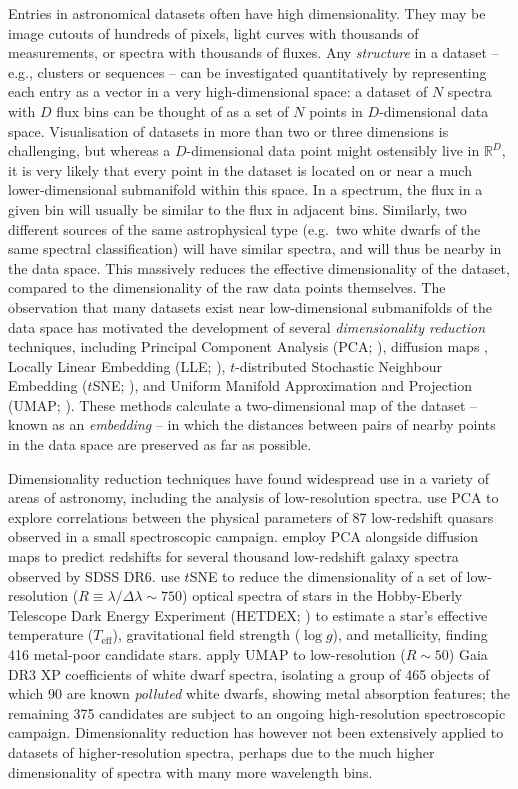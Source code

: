 \documentclass[fleqn,usenatbib]{mnras}
\def\Teff{T_\mathrm{eff}}
\begin{document}
Entries in astronomical datasets often have high dimensionality.
They may be image cutouts of hundreds of pixels, light curves with thousands of measurements, or spectra with thousands of fluxes.
Any \textit{structure} in a dataset -- e.g., clusters or sequences -- can be investigated quantitatively by representing each entry as a vector in a very high-dimensional space: a dataset of $N$ spectra with $D$ flux bins can be thought of as a set of $N$ points in $D$-dimensional data space.
Visualisation of datasets in more than two or three dimensions is challenging, but whereas a $D$-dimensional data point might ostensibly live in $\mathbb{R}^D$, it is very likely that every point in the dataset is located on or near a much lower-dimensional submanifold within this space.
In a spectrum, the flux in a given bin will usually be similar to the flux in adjacent bins.
Similarly, two different sources of the same astrophysical type (e.g.\ two white dwarfs of the same spectral classification) will have similar spectra, and will thus be nearby in the data space.
This massively reduces the effective dimensionality of the dataset, compared to the dimensionality of the raw data points themselves.
The observation that many datasets exist near low-dimensional submanifolds of the data space has motivated the development of several \textit{dimensionality reduction} techniques, including Principal Component Analysis (PCA; \citealt{pca}), diffusion maps \citep{coifman06, lafon06}, Locally Linear Embedding (LLE; \citealt{roweis00}), $t$-distributed Stochastic Neighbour Embedding ($t$SNE; \citealt{tsne}), and Uniform Manifold Approximation and Projection (UMAP; \citealt{umap}).
These methods calculate a two-dimensional map of the dataset -- known as an \textit{embedding} -- in which the distances between pairs of nearby points in the data space are preserved as far as possible.

Dimensionality reduction techniques have found widespread use in a variety of areas of astronomy, including the analysis of low-resolution spectra.
\citet{boroson92} use PCA to explore correlations between the physical parameters of 87 low-redshift quasars observed in a small spectroscopic campaign.
\citet{richards09} employ PCA alongside diffusion maps to predict redshifts for several thousand low-redshift galaxy spectra observed by SDSS DR6.
\citet{hawkins21} use $t$SNE to reduce the dimensionality of a set of low-resolution ($R\equiv \lambda / \Delta \lambda \sim750$) optical spectra of stars in the Hobby-Eberly Telescope Dark Energy Experiment (HETDEX; \citealt{gebhardt21}) to estimate a star's effective temperature ($\Teff$), gravitational field strength ($\log g$), and metallicity, finding 416 metal-poor candidate stars.
\citet{kao24} apply UMAP to low-resolution ($R\sim50$) Gaia DR3 XP coefficients of white dwarf spectra, isolating a group of 465 objects of which 90 are known \textit{polluted} white dwarfs, showing metal absorption features; the remaining 375 candidates are subject to an ongoing high-resolution spectroscopic campaign.
Dimensionality reduction has however not been extensively applied to datasets of higher-resolution spectra, perhaps due to the much higher dimensionality of spectra with many more wavelength bins.
\end{document}
